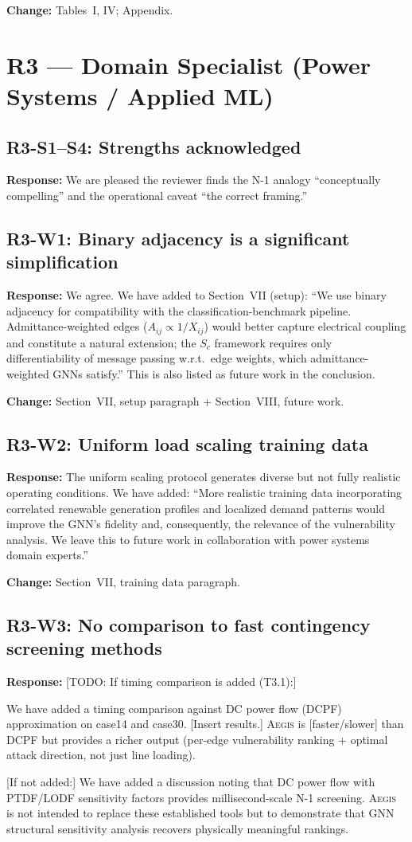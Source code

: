 \documentclass[11pt]{article}
\newcommand{\reviewer}[1]{\subsection*{\textcolor{revcolor}{#1}}}
\newcommand{\response}[1]{\textcolor{responsecolor}{\textbf{Response:} #1}}
\newcommand{\change}[1]{\textcolor{changecolor}{\textbf{Change:} #1}}
\newcommand{\AEGIS}{\textsc{Aegis}}
\begin{document}
\change{Tables~I, IV; Appendix.}

\section*{R3 --- Domain Specialist (Power Systems / Applied ML)}

\reviewer{R3-S1--S4: Strengths acknowledged}

\response{We are pleased the reviewer finds the N-1 analogy ``conceptually compelling'' and the operational caveat ``the correct framing.''}


\reviewer{R3-W1: Binary adjacency is a significant simplification}

\response{
We agree. We have added to Section~VII (setup): ``We use binary adjacency for compatibility with the classification-benchmark pipeline. Admittance-weighted edges ($A_{ij} \propto 1/X_{ij}$) would better capture electrical coupling and constitute a natural extension; the $S_c$ framework requires only differentiability of message passing w.r.t.\ edge weights, which admittance-weighted GNNs satisfy.'' This is also listed as future work in the conclusion.
}

\change{Section~VII, setup paragraph + Section~VIII, future work.}


\reviewer{R3-W2: Uniform load scaling training data}

\response{
The uniform scaling protocol generates diverse but not fully realistic operating conditions. We have added: ``More realistic training data incorporating correlated renewable generation profiles and localized demand patterns would improve the GNN's fidelity and, consequently, the relevance of the vulnerability analysis. We leave this to future work in collaboration with power systems domain experts.''
}

\change{Section~VII, training data paragraph.}


\reviewer{R3-W3: No comparison to fast contingency screening methods}

\response{
[TODO: If timing comparison is added (T3.1):]

We have added a timing comparison against DC power flow (DCPF) approximation on case14 and case30. [Insert results.] \AEGIS{} is [faster/slower] than DCPF but provides a richer output (per-edge vulnerability ranking + optimal attack direction, not just line loading).

[If not added:] We have added a discussion noting that DC power flow with PTDF/LODF sensitivity factors provides millisecond-scale N-1 screening. \AEGIS{} is not intended to replace these established tools but to demonstrate that GNN structural sensitivity analysis recovers physically meaningful rankings.
}
\end{document}
